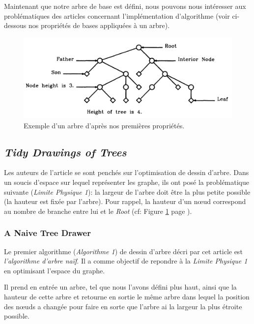 \documentclass{article}
\begin{document}
Maintenant que notre arbre de base est défini, nous pouvons nous intéresser aux problématiques des articles concernant l'implémentation d'algorithme (voir ci-dessous nos propriétés de bases appliquées à un arbre).

\vfill
\begin{figure}[h]
		\begin{center}
			\includegraphics[scale=0.4]{arbre.png}
		\end{center}
	\caption{Exemple d'un arbre d'après nos premières propriétés. \cite{article79}}
  \label{fig:arbre}
\end{figure}
\vfill

\newpage
  \subsection{\emph{Tidy Drawings of Trees}}

  Les auteurs de l'article se sont penchés sur l'optimisation de dessin d'arbre. Dans un soucis d'espace sur lequel représenter les graphe, ils ont posé la problématique suivante (\emph{Limite Physique 1}):  la largeur de l’arbre doit être la plus petite possible (la hauteur est fixée par l’arbre). Pour rappel, la hauteur d'un n\oe{}ud correspond au nombre de branche entre lui et le \emph{Root} (cf: Figure \ref{fig:arbre} page \pageref{fig:arbre}).
    \subsubsection{A Naive Tree Drawer}

    Le premier algorithme (\emph{Algorithme 1}) de dessin d'arbre décri par cet article est \emph{l'algorithme d'arbre naïf}. Il a comme objectif de repondre à la \emph{Limite Physique 1} en optimisant l'espace du graphe.

    Il prend en entrée un arbre, tel que nous l'avons défini plus haut, ainsi que la hauteur de cette arbre et retourne en sortie le même arbre dans lequel la position des n\oe{}uds a changée pour faire en sorte que l'arbre ai la largeur la plus étroite possible.
\end{document}
